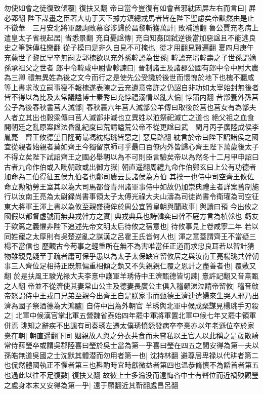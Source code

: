 勿使如會之徒復致傾覆|{
	復扶又翻}
帝曰當今豈復有如會者邪紞因屏左右而言曰|{
	屛必郢翻}
陛下謀畫之臣著大功于天下據方鎮總戎馬者皆在陛下聖慮矣帝默然由是止不徵華　三月安北將軍嚴詢敗慕容涉歸於昌黎斬獲萬計|{
	敗補邁翻}
魯公賈充老病上遣皇太子省視起居|{
	省悉景翻}
充自憂諡傳|{
	充自知姦回弑逆後當加惡諡且不能逃良史之筆誅傳柱戀翻}
從子模曰是非久自見不可掩也|{
	從才用翻見賢遍翻}
夏四月庚午充薨世子黎民早卒無嗣妻郭槐欲以充外孫韓謐為世孫|{
	韓謐充壻韓壽之子世孫謂嫡孫承祖父之世者}
郎中令韓咸中尉曹軫諫曰|{
	晉制諸王及諸郡公國有郎中令中尉大農為三卿}
禮無異姓為後之文今而行之是使先公受譏於後世而懷愧於地下也槐不聽咸等上書求改立嗣事寑不報槐遂表陳之云充遺意帝許之仍詔自非功如太宰始封無後者皆不得以為比及太常議謚博士秦秀曰充悖禮溺情以亂大倫|{
	悖蒲内翻}
昔鄫養外孫莒公子為後春秋書莒人滅鄫|{
	春秋襄六年莒人滅鄫公羊傳曰取後於莒也莒女有為鄫夫人者立其出也穀梁傳曰莒人滅鄫非滅也立異姓以涖祭祀滅亡之道也}
絶父祖之血食開朝廷之亂原案諡法昏亂紀度曰荒請謚荒公帝不從更諡曰武　閏月丙子廣陸成侯李胤薨　齊王攸德望日隆荀朂馮紞楊珧皆惡之|{
	惡烏路翻}
紞言於帝曰陛下詔諸侯之國宜從親者始親者莫如齊王今獨留京師可乎朂曰百僚内外皆歸心齊王陛下萬歲後太子不得立矣陛下試詔齊王之國必舉朝以為不可則臣言驗矣帝以為然冬十二月甲申詔曰古者九命作伯或入毗朝政或出御方嶽|{
	朝直遥翻周禮九命作伯鄭玄曰上公有功德者加命為二伯得征五侯九伯者也鄭司農云長諸侯為方伯}
其揆一也侍中司空齊王攸佐命立勲劬勞王室其以為大司馬都督青州諸軍事侍中如故仍加崇典禮主者詳案舊制施行以汝南王亮為太尉録尚書事領太子太傅光祿大夫山濤為司徒尚書令衛瓘為司空征東大將軍王渾上書以為攸至親盛德侔於周公宜贊皇朝與聞政事|{
	與讀曰預}
今出攸之國假以都督虚號而無典戎幹方之實|{
	典戎典兵也詩韓奕曰幹不庭方言為楨榦也}
虧友于欵篤之義懼非陛下追述先帝文明太后待攸之宿意也|{
	待攸事見上卷咸寧二年}
若以同姓寵之太厚則有吳楚逆亂之謀漢之呂霍王氏皆何人也|{
	渾之意蓋謂齊王不當疑三楊不當信也}
歷觀古今苟事之輕重所在無不為害唯當任正道而求忠良耳若以智計猜物雖親見疑至于疏者庸可保乎愚以為太子太保缺宜留攸居之與汝南王亮楊珧共幹朝事三人齊位足相持正既無偏重相傾之埶又不失親親仁覆之恩計之盡善者也|{
	覆敷又翻}
於是扶風王駿光禄大夫李憙中護軍羊琇侍中王濟甄德皆切諫|{
	憙許記翻又音熹甄之人翻}
帝並不從濟使其妻常山公主及德妻長廣公主俱入稽顙涕泣請帝留攸|{
	稽音啟}
帝怒謂侍中王戎曰兄弟至親今出齊王自是朕家事而甄德王濟連遣婦來生哭人邪乃出濟為國子祭酒德為大鴻臚|{
	自侍中出為外朝官}
羊琇與北軍中候成粲謀見楊珧手刃殺之|{
	北軍中候漢官掌北軍五營魏省泰始四年罷中軍將軍置北軍中候七年又罷中領軍併焉}
珧知之辭疾不出諷有司奏琇左遷太僕琇憤怨發病卒李憙亦以年老遜位卒於家憙在朝|{
	朝直遥翻下同}
姻親故人與之分衣共食而未嘗私以王官人以此稱之是歲散騎常侍薛瑩卒或謂吳郡陸喜曰瑩於吳士當為第一乎喜曰瑩在四五之間安得為第一夫以孫皓無道吳國之士沈默其體潜而勿用者第一也|{
	沈持林翻}
避尊居卑禄以代耕者第二也侃然體國執正不懼者第三也斟酌時宜時獻微益者第四也温恭脩慎不為謟首者第五也過此以往不足復數|{
	復扶又翻}
故彼上士多淪没而遠悔吝中士有聲位而近禍殃觀瑩之處身本末又安得為第一乎|{
	遠于願翻近其靳翻處昌呂翻}


